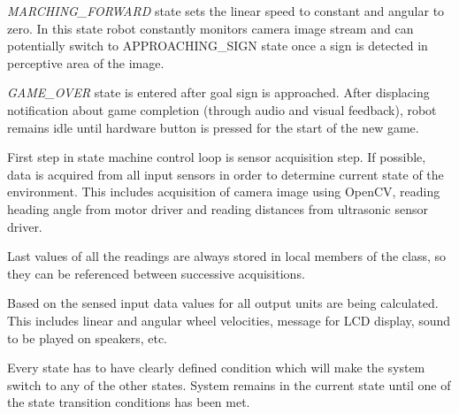 \textit{MARCHING\_FORWARD} state sets the linear speed to constant and angular to zero. In this state robot constantly monitors camera image stream and can potentially switch to APPROACHING\_SIGN state once a sign is detected in perceptive area of the image.

\textit{GAME\_OVER} state is entered after goal sign is approached. After displacing notification about game completion (through audio and visual feedback), robot remains idle until hardware button is pressed for the start of the new game.



First step in state machine control loop is sensor acquisition step. If possible, data is acquired from all input sensors in order to determine current state of the environment. This includes acquisition of camera image using OpenCV, reading heading angle from motor driver and reading distances from ultrasonic sensor driver.

Last values of all the readings are always stored in local members of the class, so they can be referenced between successive acquisitions.


Based on the sensed input data values for all output units are being calculated. This includes linear and angular wheel velocities, message for LCD display, sound to be played on speakers, etc.


Every state has to have clearly defined condition which will make the system switch to any of the other states. System remains in the current state until one of the state transition conditions has been met.



